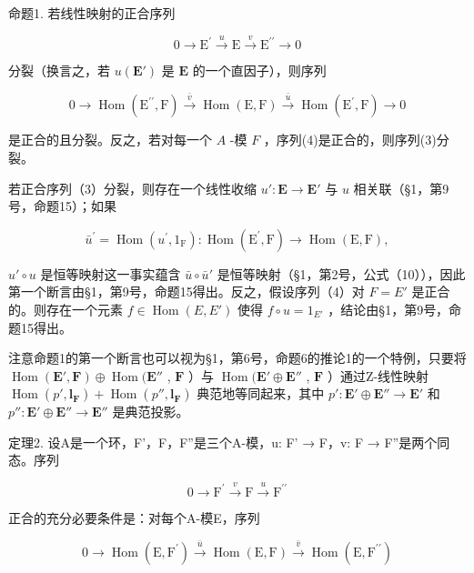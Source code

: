 命题1. 若线性映射的正合序列

\[
0 \longrightarrow \mathrm{E} ^ {\prime} \stackrel {u} {\longrightarrow} \mathrm{E} \stackrel {v} {\longrightarrow} \mathrm{E} ^ {\prime \prime} \longrightarrow 0\tag{3}
\]

分裂（换言之，若 \(u(\mathbf{E}')\) 是 \(\mathbf{E}\) 的一个直因子），则序列

\[
0 \longrightarrow \operatorname{Hom} (\mathrm{E} ^ {\prime \prime}, \mathrm{F}) \stackrel {\bar {v}} {\longrightarrow} \operatorname{Hom} (\mathrm{E}, \mathrm{F}) \stackrel {\bar {u}} {\longrightarrow} \operatorname{Hom} (\mathrm{E} ^ {\prime}, \mathrm{F}) \longrightarrow 0
\]

是正合的且分裂。反之，若对每一个 \(A\) -模 \(F\) ，序列(4)是正合的，则序列(3)分裂。

若正合序列（3）分裂，则存在一个线性收缩 \(u': \mathbf{E} \to \mathbf{E}'\) 与 \(u\) 相关联（§1，第9号，命题15）；如果

\[
\bar {u} ^ {\prime} = \operatorname{Hom} (u ^ {\prime}, 1 _ {\mathrm{F}}): \operatorname{Hom} (\mathrm{E} ^ {\prime}, \mathrm{F}) \rightarrow \operatorname{Hom} (\mathrm{E}, \mathrm{F}),
\]

\(u' \circ u\) 是恒等映射这一事实蕴含 \(\bar{u} \circ \bar{u}'\) 是恒等映射（§1，第2号，公式（10）），因此第一个断言由§1，第9号，命题15得出。反之，假设序列（4）对 \(F = E'\) 是正合的。则存在一个元素 \(f \in \operatorname{Hom}(E, E')\) 使得 \(f \circ u = 1_{E'}\) ，结论由§1，第9号，命题15得出。

注意命题1的第一个断言也可以视为§1，第6号，命题6的推论1的一个特例，只要将 \(\operatorname{Hom}(\mathbf{E}',\mathbf{F}) \oplus \operatorname{Hom}(\mathbf{E}''\) , \(\mathbf{F}\) ）与 \(\operatorname{Hom}(\mathbf{E}' \oplus \mathbf{E}''\) , \(\mathbf{F}\) ）通过Z-线性映射 \(\operatorname{Hom}(p',\mathbf{l}_{\mathbf{F}}) + \operatorname{Hom}(p'',\mathbf{l}_{\mathbf{F}})\) 典范地等同起来，其中 \(p':\mathbf{E}' \oplus \mathbf{E}'' \to \mathbf{E}'\) 和 \(p'':\mathbf{E}' \oplus \mathbf{E}'' \to \mathbf{E}''\) 是典范投影。

定理2. 设A是一个环，F'，F，F''是三个A-模，u: F' → F，v: F → F''是两个同态。序列

\[
0 \longrightarrow \mathrm{F} ^ {\prime} \stackrel {v} {\longrightarrow} \mathrm{F} \stackrel {u} {\longrightarrow} \mathrm{F} ^ {\prime \prime}\tag{5}
\]

正合的充分必要条件是：对每个A-模E，序列

\[
0 \longrightarrow \operatorname{Hom} (\mathrm{E}, \mathrm{F} ^ {\prime}) \stackrel {\bar {u}} {\longrightarrow} \operatorname{Hom} (\mathrm{E}, \mathrm{F}) \stackrel {\bar {v}} {\longrightarrow} \operatorname{Hom} (\mathrm{E}, \mathrm{F} ^ {\prime \prime})\tag{6}
\]

